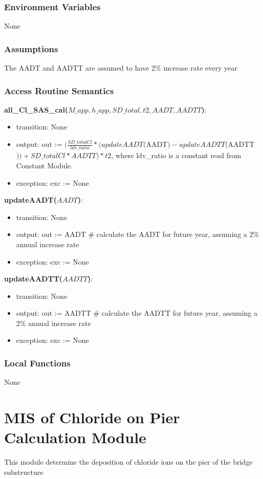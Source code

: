 \documentclass[12pt, titlepage]{article}
\begin{document}
\subsubsection{Environment Variables}
None
\subsubsection{Assumptions}
The AADT and AADTT are assumed to have 2\% increase rate every year
\subsubsection{Access Routine Semantics}

\noindent \textbf{all\_Cl\_SAS\_cal($M\_app, h\_app, SD\_total, t2, AADT, AADTT$)}:
\begin{itemize}
\item transition: None
\item output: out := $(\frac{SD\_totalCl}{ldv\_ratio}*(updateAADT($AADT$)-updateAADTT($AADTT$))+ SD\_totalCl* AADTT) * t2$, where ldv\_ratio is a constant read from Constant Module.
\item exception: exc := None
\end{itemize}
\noindent \textbf{updateAADT($AADT$)}:
\begin{itemize}
\item transition: None
\item output: out := AADT \# calculate the AADT for future year, assuming a 2\% annual increase rate 
\item exception: exc := None
\end{itemize}
\noindent \textbf{updateAADTT($AADTT$)}:
\begin{itemize}
\item transition: None
\item output: out := AADTT \# calculate the AADTT for future year, assuming a 2\% annual increase rate 
\item exception: exc := None
\end{itemize}


\subsubsection{Local Functions}
None

\newpage


\section{MIS of Chloride on Pier Calculation Module} \label{chlorideonPierCalculationModule}
This module determine the deposition of chloride ions on the pier of the bridge substructure
\end{document}
